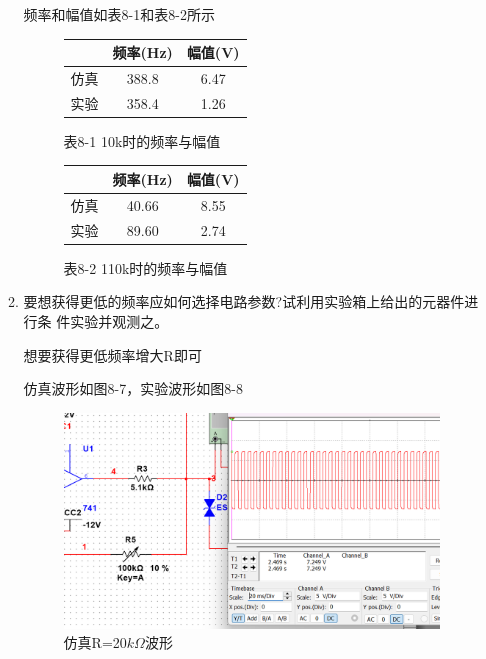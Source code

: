\documentclass[a4paper,10pt,notitlepage]{article}
\begin{document}
\begin{enumerate}
\begin{enumerate}
			频率和幅值如表8-1和表8-2所示
			\begin{figure}
				\centering
				\begin{minipage}{0.3\textwidth}
					\centering
					\begin{tabular}{|c|c|c|}
						\hline
						& 频率(Hz) & 幅值(V) \\
						\hline
						仿真 & 388.8 & 6.47 \\
						\hline 
						实验 & 358.4 & 1.26  \\
						\hline
					\end{tabular}
					\caption*{表8-1 10k时的频率与幅值}
				\end{minipage}
				\qquad
				\begin{minipage}{0.3\textwidth}
					\centering
					\begin{tabular}{|c|c|c|}
						\hline
						& 频率(Hz) & 幅值(V) \\
						\hline
						仿真 & 40.66 & 8.55 \\
						\hline 
						实验 & 89.60 & 2.74  \\
						\hline
					\end{tabular}
					\caption*{表8-2 110k时的频率与幅值}
				\end{minipage}
			\end{figure}
			\item 要想获得更低的频率应如何选择电路参数?试利用实验箱上给出的元器件进行条
			件实验并观测之。\par 
			想要获得更低频率增大R即可\par 
			仿真波形如图8-7，实验波形如图8-8
			\begin{figure}
				\centering
				\begin{minipage}{0.3\textwidth}
					\centering
					\includegraphics[width=\textwidth]{5.png}
					\caption*{仿真R=20$k\Omega$波形}

\end{minipage}
\end{figure}
\end{enumerate}
\end{enumerate}
\end{document}
